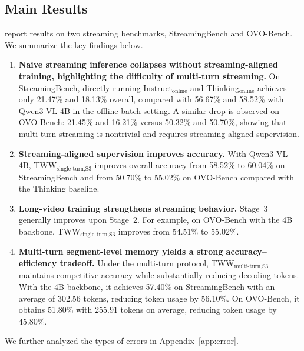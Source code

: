 \documentclass{article}
\begin{document}
\subsection{Main Results}
\label{sec:exp_main}

 report results on two streaming benchmarks, StreamingBench and OVO-Bench. We summarize the key findings below.

\begin{enumerate}[label=\textbf{\arabic*.}]
  \item \textbf{Naive streaming inference collapses without streaming-aligned training, highlighting the difficulty of multi-turn streaming.} On StreamingBench, directly running Instruct$_{\text{online}}$ and Thinking$_{\text{online}}$ achieves only 21.47\% and 18.13\% overall, compared with 56.67\% and 58.52\% with Qwen3-VL-4B in the offline batch setting. A similar drop is observed on OVO-Bench: 21.45\% and 16.21\% versus 50.32\% and 50.70\%, showing that multi-turn streaming is nontrivial and requires streaming-aligned supervision.

  \item \textbf{Streaming-aligned supervision improves accuracy.} With Qwen3-VL-4B, TWW$_{\text{single-turn,S3}}$ improves overall accuracy from 58.52\% to 60.04\% on StreamingBench and from 50.70\% to 55.02\% on OVO-Bench compared with the Thinking baseline.

  \item \textbf{Long-video training strengthens streaming behavior.} Stage~3 generally improves upon Stage~2. For example, on OVO-Bench with the 4B backbone, TWW$_{\text{single-turn,S3}}$ improves from 54.51\% to 55.02\%.

  \item \textbf{Multi-turn segment-level memory yields a strong accuracy--efficiency tradeoff.} Under the multi-turn protocol, TWW$_{\text{multi-turn,S3}}$ maintains competitive accuracy while substantially reducing decoding tokens. With the 4B backbone, it achieves 57.40\% on StreamingBench with an average of 302.56 tokens, reducing token usage by 56.10\%. On OVO-Bench, it obtains 51.80\% with 255.91 tokens on average, reducing token usage by 45.80\%.
\end{enumerate}
We further analyzed the types of errors in Appendix~\ref{app:error}.

\end{document}
